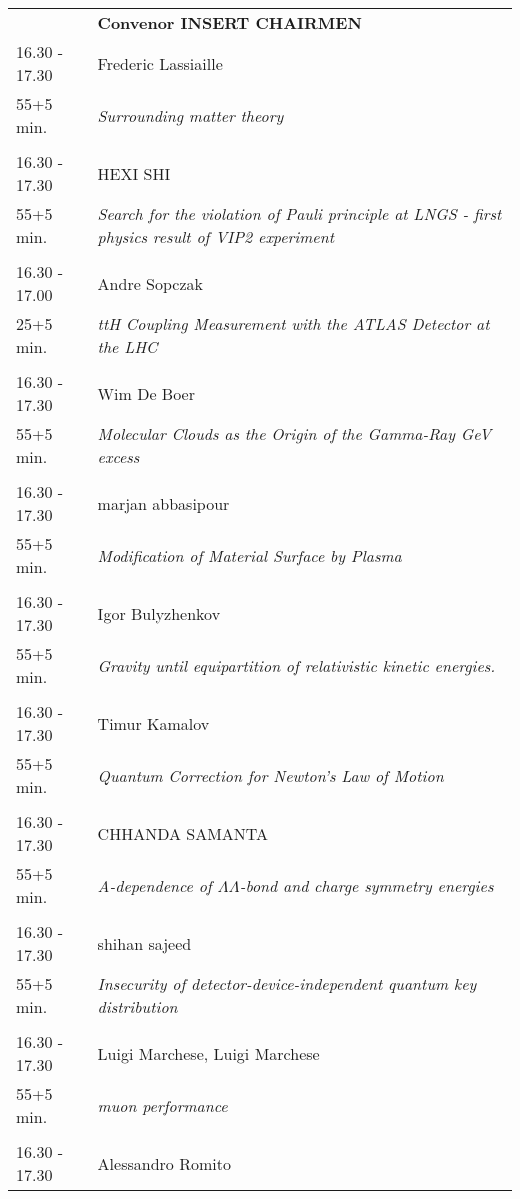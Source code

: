 \begin{longtable}{p{3cm}p{13cm}}
&\hfill {\bf Convenor INSERT CHAIRMEN }\\ 
16.30 - 17.30 & Frederic Lassiaille\\ 
55+5 min. & {\it Surrounding matter theory}\\ 
 & \\ 
16.30 - 17.30 & HEXI SHI\\ 
55+5 min. & {\it Search for the violation of Pauli principle at LNGS - first physics result of VIP2 experiment}\\ 
 & \\ 
16.30 - 17.00 & Andre Sopczak\\ 
25+5 min. & {\it ttH Coupling Measurement with the ATLAS Detector at the LHC}\\ 
 & \\ 
16.30 - 17.30 & Wim De Boer\\ 
55+5 min. & {\it Molecular Clouds as the Origin of the Gamma-Ray GeV excess}\\ 
 & \\ 
16.30 - 17.30 & marjan abbasipour\\ 
55+5 min. & {\it Modification of Material Surface by Plasma}\\ 
 & \\ 
16.30 - 17.30 & Igor Bulyzhenkov\\ 
55+5 min. & {\it Gravity until equipartition of relativistic kinetic energies.}\\ 
 & \\ 
16.30 - 17.30 & Timur Kamalov\\ 
55+5 min. & {\it Quantum Correction for Newton’s Law of Motion}\\ 
 & \\ 
16.30 - 17.30 & CHHANDA SAMANTA\\ 
55+5 min. & {\it A-dependence of $\Lambda\Lambda$-bond and charge symmetry energies}\\ 
 & \\ 
16.30 - 17.30 & shihan sajeed\\ 
55+5 min. & {\it Insecurity of detector-device-independent quantum key distribution}\\ 
 & \\ 
16.30 - 17.30 & Luigi Marchese, Luigi Marchese\\ 
55+5 min. & {\it muon performance}\\ 
 & \\ 
16.30 - 17.30 & Alessandro Romito\\ 

\end{longtable}
